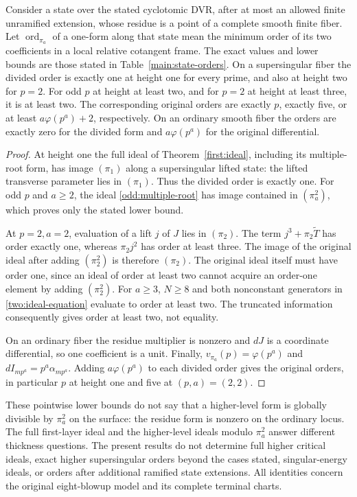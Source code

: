\begin{corollary}
\label{two:states}
Consider a state over the stated cyclotomic DVR, after at most
an allowed finite unramified extension, whose residue is a
point of a complete smooth finite fiber. Let
$\operatorname{ord}_{\pi_a}$ of a one-form along that state
mean the minimum order of its two coefficients in a local
relative cotangent frame. The exact values and lower bounds are
those stated in Table~\ref{main:state-orders}.
On a supersingular fiber the divided order is exactly one at
height one for every prime, and also at height two for $p=2$.
For odd $p$ at height at least two, and for $p=2$ at height
at least three, it is at least two. The corresponding original
orders are exactly $p$, exactly five, or at least
$a\varphi(p^a)+2$, respectively. On an ordinary smooth fiber
the orders are exactly zero for the divided form and
$a\varphi(p^a)$ for the original differential.
\end{corollary}

\begin{proof}
At height one the full ideal of Theorem~\ref{first:ideal}, including
its multiple-root form, has image $(\pi_1)$ along a
supersingular lifted state: the lifted transverse parameter
lies in $(\pi_1)$. Thus the divided order is exactly one.
For odd $p$ and $a\ge2$, the ideal
\eqref{odd:multiple-root} has image contained in
$(\pi_a^2)$, which proves only the stated lower bound.

At $p=2,a=2$, evaluation of a lift $j$ of $J$ lies in
$(\pi_2)$. The term $j^3+\pi_2\widetilde T$ has order
exactly one, whereas $\pi_2j^2$ has order at least three.
The image of the original ideal after adding $(\pi_2^2)$
is therefore $(\pi_2)$. The original ideal itself must have
order one, since an ideal of order at least two cannot
acquire an order-one element by adding $(\pi_2^2)$.
For $a\ge3$, $N\ge8$ and both nonconstant generators
in \eqref{two:ideal-equation} evaluate to order at least
two. The truncated information consequently gives order
at least two, not equality.

On an ordinary fiber the residue multiplier is nonzero
and $dJ$ is a coordinate differential, so one coefficient
is a unit. Finally,
$v_{\pi_a}(p)=\varphi(p^a)$ and
$dI_{mp^a}=p^a\alpha_{mp^a}$. Adding
$a\varphi(p^a)$ to each divided order gives the original orders,
in particular $p$ at height one and five at
$(p,a)=(2,2)$.
\end{proof}

These pointwise lower bounds do not say that a higher-level
form is globally divisible by $\pi_a^2$ on the surface:
the residue form is nonzero on the ordinary locus. The full
first-layer ideal and the higher-level ideals modulo
$\pi_a^2$ answer different thickness questions. The present
results do not determine full higher critical ideals,
exact higher supersingular orders beyond the cases stated,
singular-energy ideals, or orders after additional ramified
state extensions. All identities concern the original
eight-blowup model and its complete terminal charts.
